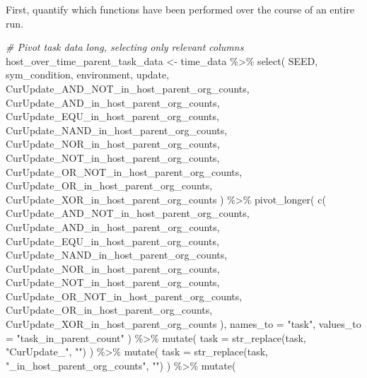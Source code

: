 \documentclass[
]{book}
\newenvironment{Shaded}{\begin{snugshade}}{\end{snugshade}}
\newcommand{\AttributeTok}[1]{\textcolor[rgb]{0.77,0.63,0.00}{#1}}
\newcommand{\CommentTok}[1]{\textcolor[rgb]{0.56,0.35,0.01}{\textit{#1}}}
\newcommand{\FunctionTok}[1]{\textcolor[rgb]{0.00,0.00,0.00}{#1}}
\newcommand{\NormalTok}[1]{#1}
\newcommand{\OtherTok}[1]{\textcolor[rgb]{0.56,0.35,0.01}{#1}}
\newcommand{\SpecialCharTok}[1]{\textcolor[rgb]{0.00,0.00,0.00}{#1}}
\newcommand{\StringTok}[1]{\textcolor[rgb]{0.31,0.60,0.02}{#1}}
\begin{document}
First, quantify which functions have been performed over the course of an entire run.

\begin{Shaded}
\begin{Highlighting}[]
\CommentTok{\# Pivot task data long, selecting only relevant columns}
\NormalTok{host\_over\_time\_parent\_task\_data }\OtherTok{\textless{}{-}}\NormalTok{ time\_data }\SpecialCharTok{\%\textgreater{}\%}
  \FunctionTok{select}\NormalTok{(}
\NormalTok{    SEED,}
\NormalTok{    sym\_condition,}
\NormalTok{    environment,}
\NormalTok{    update,}
\NormalTok{    CurUpdate\_AND\_NOT\_in\_host\_parent\_org\_counts,}
\NormalTok{    CurUpdate\_AND\_in\_host\_parent\_org\_counts,}
\NormalTok{    CurUpdate\_EQU\_in\_host\_parent\_org\_counts,}
\NormalTok{    CurUpdate\_NAND\_in\_host\_parent\_org\_counts,}
\NormalTok{    CurUpdate\_NOR\_in\_host\_parent\_org\_counts,}
\NormalTok{    CurUpdate\_NOT\_in\_host\_parent\_org\_counts,}
\NormalTok{    CurUpdate\_OR\_NOT\_in\_host\_parent\_org\_counts,}
\NormalTok{    CurUpdate\_OR\_in\_host\_parent\_org\_counts,}
\NormalTok{    CurUpdate\_XOR\_in\_host\_parent\_org\_counts}
\NormalTok{  ) }\SpecialCharTok{\%\textgreater{}\%}
  \FunctionTok{pivot\_longer}\NormalTok{(}
    \FunctionTok{c}\NormalTok{(}
\NormalTok{      CurUpdate\_AND\_NOT\_in\_host\_parent\_org\_counts,}
\NormalTok{      CurUpdate\_AND\_in\_host\_parent\_org\_counts,}
\NormalTok{      CurUpdate\_EQU\_in\_host\_parent\_org\_counts,}
\NormalTok{      CurUpdate\_NAND\_in\_host\_parent\_org\_counts,}
\NormalTok{      CurUpdate\_NOR\_in\_host\_parent\_org\_counts,}
\NormalTok{      CurUpdate\_NOT\_in\_host\_parent\_org\_counts,}
\NormalTok{      CurUpdate\_OR\_NOT\_in\_host\_parent\_org\_counts,}
\NormalTok{      CurUpdate\_OR\_in\_host\_parent\_org\_counts,}
\NormalTok{      CurUpdate\_XOR\_in\_host\_parent\_org\_counts}
\NormalTok{    ),}
    \AttributeTok{names\_to =} \StringTok{"task"}\NormalTok{,}
    \AttributeTok{values\_to =} \StringTok{"task\_in\_parent\_count"}
\NormalTok{  ) }\SpecialCharTok{\%\textgreater{}\%}
  \FunctionTok{mutate}\NormalTok{(}
    \AttributeTok{task =} \FunctionTok{str\_replace}\NormalTok{(task, }\StringTok{"CurUpdate\_"}\NormalTok{, }\StringTok{""}\NormalTok{)}
\NormalTok{  ) }\SpecialCharTok{\%\textgreater{}\%}
  \FunctionTok{mutate}\NormalTok{(}
    \AttributeTok{task =} \FunctionTok{str\_replace}\NormalTok{(task, }\StringTok{"\_in\_host\_parent\_org\_counts"}\NormalTok{, }\StringTok{""}\NormalTok{)}
\NormalTok{  ) }\SpecialCharTok{\%\textgreater{}\%}
  \FunctionTok{mutate}\NormalTok{(}

\end{Highlighting}
\end{Shaded}
\end{document}

